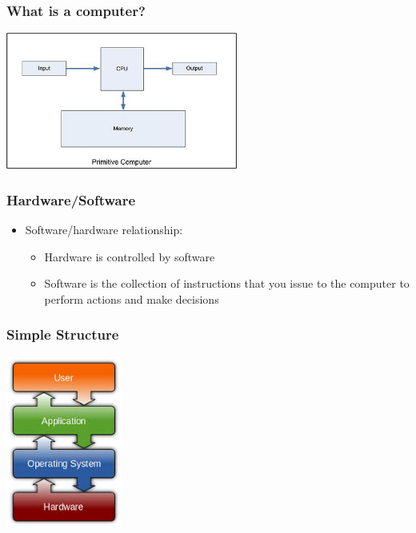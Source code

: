 \documentclass{beamer}
\begin{document}
\begin{frame}
  \frametitle{What is a computer?}
     \begin{center}
        \includegraphics[width=3in]{images/simple.jpg}
    \end{center}
\end{frame}
\begin{frame}
  \frametitle{Hardware/Software}
	\begin{itemize}
        \item Software/hardware relationship:
        \begin{itemize}
			\item Hardware is controlled by software
			\item Software is the collection of instructions that you issue to the computer to perform actions and make decisions
		\end{itemize}
    \end{itemize}
\end{frame}
\begin{frame}
  \frametitle{Simple Structure}

        \begin{center}
        \includegraphics[width=1.5in]{images/structure.jpeg}
    \end{center}
\end{frame}
\end{document}
